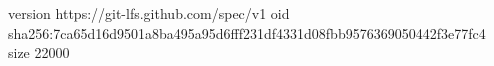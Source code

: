 version https://git-lfs.github.com/spec/v1
oid sha256:7ca65d16d9501a8ba495a95d6fff231df4331d08fbb9576369050442f3e77fc4
size 22000
